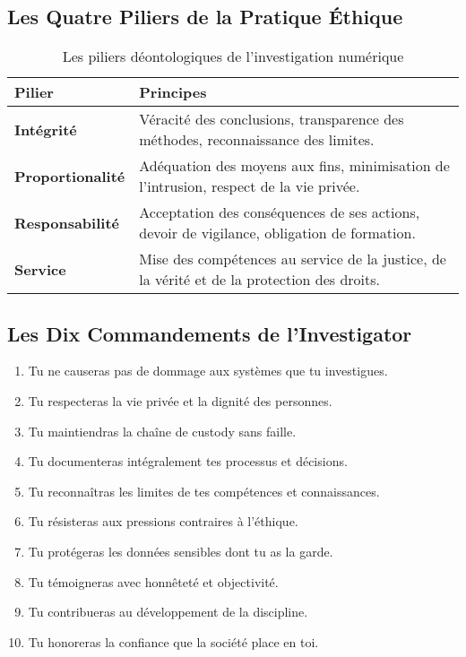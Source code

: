 \documentclass[11pt,a4paper,oneside]{book}
\begin{document}
            \subsection*{Les Quatre Piliers de la Pratique Éthique}
                \begin{table}[H]
                    \centering
                    \begin{tabular}{p{3cm}p{9cm}}
                        \hline
                        \textbf{Pilier} & \textbf{Principes} \\
                        \hline
                        \textbf{Intégrité} & Véracité des conclusions, transparence des méthodes, reconnaissance des limites. \\
                        \textbf{Proportionalité} & Adéquation des moyens aux fins, minimisation de l'intrusion, respect de la vie privée.\\
                        \textbf{Responsabilité} & Acceptation des conséquences de ses actions, devoir de vigilance, obligation de formation. \\
                        \textbf{Service} & Mise des compétences au service de la justice, de la vérité et de la protection des droits. \\
                        \hline
                    \end{tabular}
                    \caption{Les piliers déontologiques de l'investigation numérique}
                \end{table}

            \subsection*{Les Dix Commandements de l'Investigator}
                \begin{enumerate}
                    \item Tu ne causeras pas de dommage aux systèmes que tu investigues.
                    \item Tu respecteras la vie privée et la dignité des personnes.
                    \item Tu maintiendras la chaîne de custody sans faille.
                    \item Tu documenteras intégralement tes processus et décisions.
                    \item Tu reconnaîtras les limites de tes compétences et connaissances.
                    \item Tu résisteras aux pressions contraires à l'éthique.
                    \item Tu protégeras les données sensibles dont tu as la garde.
                    \item Tu témoigneras avec honnêteté et objectivité.
                    \item Tu contribueras au développement de la discipline.
                    \item Tu honoreras la confiance que la société place en toi.
                \end{enumerate}
\end{document}
